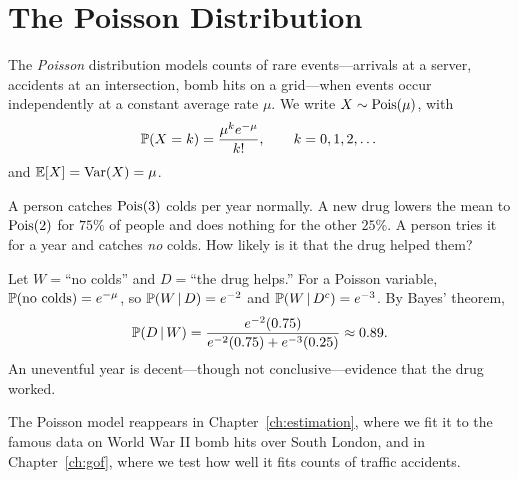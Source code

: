 \section{The Poisson Distribution}

The \emph{Poisson} distribution models counts of rare events—arrivals at a
server, accidents at an intersection, bomb hits on a grid—when events occur
independently at a constant average rate $\mu$. We write $X\sim\mathrm{Pois}(\mu)$, with
\[
  \mathbb{P}(X=k)=\frac{\mu^k e^{-\mu}}{k!},\qquad k=0,1,2,\dots
\]
and $\mathbb{E}[X]=\mathrm{Var}(X)=\mu$.

\begin{example}
A person catches $\mathrm{Pois}(3)$ colds per year normally. A new drug lowers the mean
to $\mathrm{Pois}(2)$ for $75\%$ of people and does nothing for the other $25\%$. A
person tries it for a year and catches \emph{no} colds. How likely is it that
the drug helped them?

\solution Let $W=$``no colds'' and $D=$``the drug helps.'' For a Poisson
variable, $\mathbb{P}(\text{no colds})=e^{-\mu}$, so $\mathbb{P}(W\,|\, D)=e^{-2}$ and
$\mathbb{P}(W\,|\, D^c)=e^{-3}$. By Bayes' theorem,
\[
  \mathbb{P}(D\,|\, W)=\frac{e^{-2}(0.75)}{e^{-2}(0.75)+e^{-3}(0.25)}\approx 0.89.
\]
An uneventful year is decent—though not conclusive—evidence that the drug
worked.
\end{example}

The Poisson model reappears in Chapter~\ref{ch:estimation}, where we fit it to
the famous data on World War II bomb hits over South London, and in
Chapter~\ref{ch:gof}, where we test how well it fits counts of traffic
accidents.
